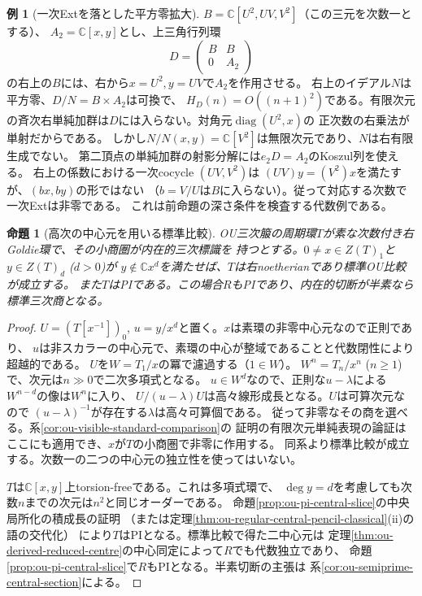 \documentclass[11pt,a4paper]{ltjsarticle}
\newtheorem{proposition}[theorem]{命題}
\theoremstyle{definition}
\newtheorem{example}[theorem]{例}
\begin{document}
\begin{example}[一次Extを落とした平方零拡大]
$B=\mathbb C[U^2,UV,V^2]$（この三元を次数一とする）、
$A_2=\mathbb C[x,y]$とし、上三角行列環
\[
 D=\begin{pmatrix}B&B\\0&A_2\end{pmatrix}
\]
の右上の$B$には、右から$x=U^2,y=UV$で$A_2$を作用させる。
右上のイデアル$N$は平方零、$D/N=B\times A_2$は可換で、
$H_D(n)=O((n+1)^2)$である。有限次元の斉次右単純加群は$D$には入らない。対角元$\operatorname{diag}(U^2,x)$の
正次数の右乗法が単射だからである。
しかし$N/N(x,y)=\mathbb C[V^2]$は無限次元であり、$N$は右有限生成でない。
第二頂点の単純加群の射影分解には$e_2D=A_2$のKoszul列を使える。
右上の係数における一次cocycle $(UV,V^2)$は
$(UV)y=(V^2)x$を満たすが、$(b x,b y)$の形ではない
（$b=V/U$は$B$に入らない）。従って対応する次数で一次Extは非零である。
これは前命題の深さ条件を検査する代数例である。
\end{example}

\begin{proposition}[高次の中心元を用いる標準比較]
\label{prop:ou-high-centre-small-comparison}
OU三次箙の周期環$T$が素な次数付き右Goldie環で、その小商圏が内在的三次標識を
持つとする。$0\ne x\in Z(T)_1$と$y\in Z(T)_d$ ($d>0$)が
$y\notin\mathbb C x^d$を満たせば、$T$は右noetherianであり標準OU比較が成立する。
また$T$はPIである。この場合$R$もPIであり、内在的切断が半素なら標準三次商となる。
\end{proposition}
\begin{proof}
$U=(T[x^{-1}])_0$, $u=y/x^d$と置く。$x$は素環の非零中心元なので正則であり、
$u$は非スカラーの中心元で、素環の中心が整域であることと代数閉性により超越的である。
$U$を$W=T_1/x$の冪で濾過する（$1\in W$）。
$W^n=T_n/x^n$ ($n\ge1$)で、次元は$n\gg0$で二次多項式となる。
$u\in W^d$なので、正則な$u-\lambda$による$W^{n-d}$の像は$W^n$に入り、
$U/(u-\lambda)U$は高々線形成長となる。$U$は可算次元なので
$(u-\lambda)^{-1}$が存在する$\lambda$は高々可算個である。
従って非零なその商を選べる。系\ref{cor:ou-visible-standard-comparison}の
証明の有限次元単純表現の論証はここにも適用でき、$x$が$T$の小商圏で非零に作用する。
同系より標準比較が成立する。次数一の二つの中心元の独立性を使ってはいない。

$T$は$\mathbb C[x,y]$上torsion-freeである。これは多項式環で、
$\deg y=d$を考慮しても次数$n$までの次元は$n^2$と同じオーダーである。
命題\ref{prop:ou-pi-central-slice}の中央局所化の積成長の証明
（または定理\ref{thm:ou-regular-central-pencil-classical}(ii)の語の交代化）
により$T$はPIとなる。標準比較で得た二中心元は
定理\ref{thm:ou-derived-reduced-centre}の中心同定によって$R$でも代数独立であり、
命題\ref{prop:ou-pi-central-slice}で$R$もPIとなる。半素切断の主張は
系\ref{cor:ou-semiprime-central-section}による。
\end{proof}
\end{document}
